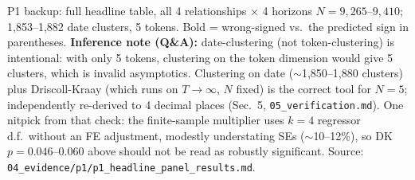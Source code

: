 \documentclass[aspectratio=169]{beamer}
\begin{document}
\begin{frame}{P1 backup: full headline table, all 4 relationships $\times$ 4 horizons}
  \vspace{0.3em}
  \tiny $N=9{,}265$--$9{,}410$; 1{,}853--1{,}882 date clusters, 5 tokens. Bold = wrong-signed vs.\ the predicted sign in parentheses. \textbf{Inference note (Q\&A):} date-clustering (not token-clustering) is intentional: with only 5 tokens, clustering on the token dimension would give 5 clusters, which is invalid asymptotics. Clustering on date ($\sim$1{,}850--1{,}880 clusters) plus Driscoll-Kraay (which runs on $T\to\infty$, $N$ fixed) is the correct tool for $N=5$; independently re-derived to 4 decimal places (Sec.\ 5, \texttt{05\_verification.md}). One nitpick from that check: the finite-sample multiplier uses $k=4$ regressor d.f.\ without an FE adjustment, modestly understating SEs ($\sim$10--12\%), so DK $p=0.046$--$0.060$ above should not be read as robustly significant. Source: \texttt{04\_evidence/p1/p1\_headline\_panel\_results.md}.
\end{frame}
\end{document}
